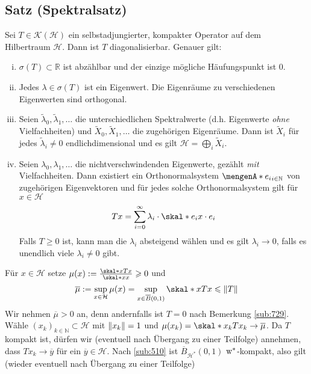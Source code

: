 \subsection[Satz: Diagonalisierbarkeit selbstadjungierter, kompakter Operatoren (Spektralsatz)]{Satz (Spektralsatz)} %
\label{sub:810}
Sei $T \in \mathcal{K}(\mathcal{H})$ ein selbstadjungierter, kompakter Operator auf dem Hilbertraum $\mathcal{H}$. Dann ist $T$ diagonalisierbar. Genauer gilt:
\begin{enumerate}[(i)]
	\item $\sigma(T) \subset \mathds{R}$ ist abzählbar und der einzige mögliche Häufungspunkt ist $0$.
	\item Jedes $\lambda \in \sigma(T)$ ist ein Eigenwert. Die Eigenräume zu verschiedenen Eigenwerten sind orthogonal.
	\item Seien $\tilde{\lambda}_0, \tilde{\lambda}_1, \ldots $ die unterschiedlichen Spektralwerte (d.h. Eigenwerte \emph{ohne} Vielfachheiten) und 
	$\tilde{X}_0,\tilde{X}_1,\ldots$ die zugehörigen Eigenräume. Dann ist $\tilde{X}_i$ für jedes $\tilde{\lambda}_i\not=0$ endlichdimensional und es gilt 
	$\mathcal{H}= \bigoplus_i \tilde{X}_i$.
	\item Seien $\lambda_0, \lambda_1,\ldots $ die nichtverschwindenden Eigenwerte, gezählt \emph{mit} Vielfachheiten. Dann existiert ein Orthonormalsystem 
	$\set{e_i}_{i \in \mathds{N}}$ von zugehörigen Eigenvektoren und für jedes solche Orthonormalsystem gilt für $x \in \mathcal{H}$
	\[
		T x = \sum_{i=0}^{\infty} \lambda_i \cdot \skal*{e_i}{x} \cdot e_i 
	\]
	Falls $T\ge 0$ ist, kann man die $\lambda_i$ absteigend wählen und es gilt $\lambda_i \to 0$, falls es unendlich viele $\lambda_i\not=0$ gibt.
\end{enumerate}
Für $x \in \mathcal{H}$ setze $\mu(x) := \frac{\skal*{x}{T x}}{\skal*{x}{x}}\ge 0$ und
\[
	\overline{\mu} := \sup_{x \in \mathcal{H}} \mu(x) = \sup_{x \in \overline{B}(0,1)} \skal*{x}{T x} \le \norm{T} 
\]
Wir nehmen $\overline{\mu} >0$ an, denn andernfalls ist $T=0$ nach Bemerkung \ref{sub:729}. Wähle $(x_k)_{k \in \mathds{N}} \subset \mathcal{H}$ mit $\norm{x_k}=1$ und 
$\mu(x_k)= \skal*{x_k}{T x_k} \to \overline{\mu}$. Da $T$ kompakt ist, dürfen wir (eventuell nach Übergang zu einer Teilfolge) annehmen, dass $T x_k \to \overline{y}$ für
ein $\overline{y}\in \mathcal{H}$.
Nach \ref{sub:510} ist $\overline{B}_{\mathcal{H}^*}(0,1)$ $\mathrm{w}^*$-kompakt, also gilt (wieder eventuell nach Übergang zu einer Teilfolge) 
